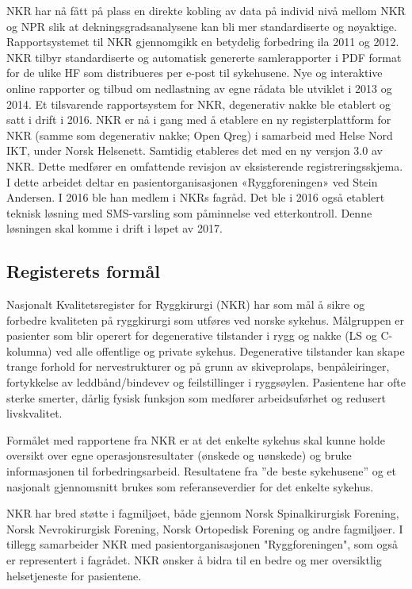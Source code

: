\documentclass[norsk, a4paper, twocolumn]{report}
\begin{document}
NKR har nå fått på plass en direkte kobling av data på individ nivå mellom NKR og NPR slik at dekningsgradsanalysene kan bli mer standardiserte og nøyaktige. Rapportsystemet til NKR gjennomgikk en betydelig forbedring ila 2011 og 2012. NKR tilbyr standardiserte og automatisk genererte samlerapporter i PDF format for de ulike HF som distribueres per e-post til sykehusene.  Nye og interaktive online rapporter og tilbud om nedlastning av egne rådata ble utviklet i 2013 og 2014. Et tilsvarende rapportsystem for NKR, degenerativ nakke ble etablert og satt i drift i 2016. NKR er nå i gang med å etablere en ny registerplattform for NKR (samme som degenerativ nakke; Open Qreg) i samarbeid med Helse Nord IKT,  under Norsk Helsenett. Samtidig etableres det med en ny versjon 3.0 av NKR. Dette medfører en omfattende revisjon av eksisterende registreringsskjema. I dette arbeidet deltar en pasientorganisasjonen «Ryggforeningen» ved Stein Andersen. I 2016 ble han medlem i NKRs fagråd. Det ble i 2016 også etablert teknisk løsning med SMS-varsling som påminnelse ved etterkontroll. Denne løsningen skal komme i drift i løpet av 2017.

\subsection{Registerets formål}\label{sec:for}
Nasjonalt Kvalitetsregister for Ryggkirurgi (NKR) har som mål å sikre og forbedre kvaliteten på ryggkirurgi som utføres ved norske sykehus. 
Målgruppen er pasienter som blir operert for degenerative tilstander i rygg og nakke (LS og C-kolumna) ved alle offentlige og private sykehus. Degenerative tilstander kan skape trange forhold for nervestrukturer og på grunn av skiveprolaps, benpåleiringer, fortykkelse av leddbånd/bindevev og feilstillinger i ryggsøylen. Pasientene har ofte sterke smerter, dårlig fysisk funksjon som medfører arbeidsuførhet og redusert livskvalitet.

Formålet med rapportene fra NKR er at det enkelte sykehus skal kunne holde oversikt over egne operasjonsresultater (ønskede og uønskede) og bruke informasjonen til forbedringsarbeid. Resultatene fra ”de beste sykehusene” og et nasjonalt gjennomsnitt brukes som referanseverdier for det enkelte sykehus.

NKR har bred støtte i fagmiljøet, både gjennom Norsk Spinalkirurgisk Forening, Norsk Nevrokirurgisk Forening, Norsk Ortopedisk Forening og andre fagmiljøer. I tillegg samarbeider NKR med pasientorganisasjonen "Ryggforeningen", som også er representert i fagrådet.  NKR ønsker å bidra til en bedre og mer oversiktlig helsetjeneste for pasientene. 
\end{document}
